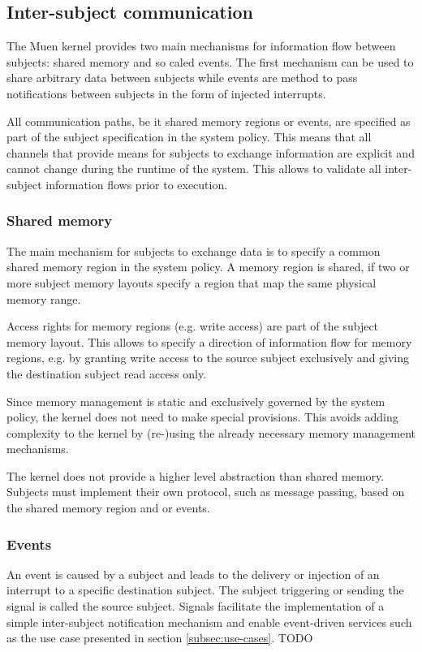 \subsection{Inter-subject communication}
The Muen kernel provides two main mechanisms for information flow between
subjects: shared memory and so caled events. The first mechanism can be used to
share arbitrary data between subjects while events are method to pass
notifications between subjects in the form of injected interrupts.

All communication paths, be it shared memory regions or events, are specified as
part of the subject specification in the system policy. This means that all
channels that provide means for subjects to exchange information are explicit
and cannot change during the runtime of the system. This allows to validate all
inter-subject information flows prior to execution.

\subsubsection{Shared memory}
The main mechanism for subjects to exchange data is to specify a common shared
memory region in the system policy. A memory region is shared, if two or more
subject memory layouts specify a region that map the same physical memory range.

Access rights for memory regions (e.g. write access) are part of the subject
memory layout. This allows to specify a direction of information flow for memory
regions, e.g. by granting write access to the source subject exclusively and
giving the destination subject read access only.

Since memory management is static and exclusively governed by the system policy,
the kernel does not need to make special provisions. This avoids adding
complexity to the kernel by (re-)using the already necessary memory management
mechanisms.

The kernel does not provide a higher level abstraction than shared memory.
Subjects must implement their own protocol, such as message passing, based on
the shared memory region and or events.

\subsubsection{Events}
An event is caused by a subject and leads to the delivery or injection of an
interrupt to a specific destination subject. The subject triggering or sending
the signal is called the source subject. Signals facilitate the implementation
of a simple inter-subject notification mechanism and enable event-driven
services such as the use case presented in section \ref{subsec:use-cases}. TODO

